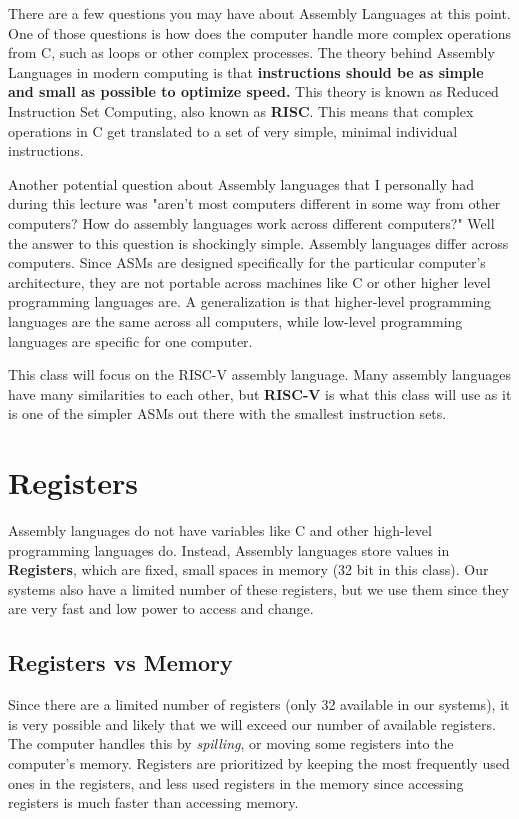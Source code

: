 \documentclass[letterpaper]{article}
\theoremstyle{remark}
\begin{document}
There are a few questions you may have about Assembly Languages at this point. One of those questions is how does the computer handle more complex operations from C, such as loops or other complex processes. The theory behind Assembly Languages in modern computing is that \textbf{instructions should be as simple and small as possible to optimize speed.} This theory is known as Reduced Instruction Set Computing, also known as \textbf{RISC}. This means that complex operations in C get translated to a set of very simple, minimal individual instructions.

Another potential question about Assembly languages that I personally had during this lecture was "aren't most computers different in some way from other computers? How do assembly languages work across different computers?" Well the answer to this question is shockingly simple. Assembly languages differ across computers. Since ASMs are designed specifically for the particular computer's architecture, they are not portable across machines like C or other higher level programming languages are. A generalization is that higher-level programming languages are the same across all computers, while low-level programming languages are specific for one computer.

This class will focus on the RISC-V assembly language. Many assembly languages have many similarities to each other, but \textbf{RISC-V} is what this class will use as it is one of the simpler ASMs out there with the smallest instruction sets.

\section{Registers}
Assembly languages do not have variables like C and other high-level programming languages do. Instead, Assembly languages store values in \textbf{Registers}, which are fixed, small spaces in memory (32 bit in this class). Our systems also have a limited number of these registers, but we use them since they are very fast and low power to access and change.

\subsection{Registers vs Memory}
Since there are a limited number of registers (only 32 available in our systems), it is very possible and likely that we will exceed our number of available registers. The computer handles this by \textit{spilling}, or moving some registers into the computer's memory. Registers are prioritized by keeping the most frequently used ones in the registers, and less used registers in the memory since accessing registers is much faster than accessing memory.
\end{document}
